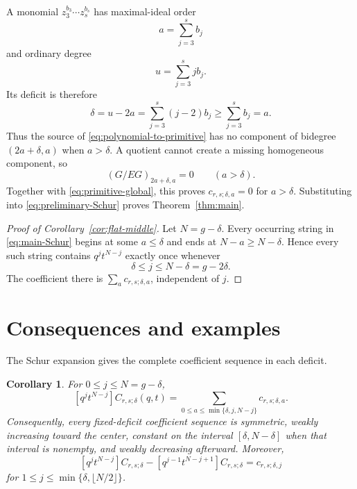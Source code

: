 \documentclass[11pt]{article}
\newtheorem{corollary}[theorem]{Corollary}
\begin{document}
A monomial $z_3^{b_3}\cdots z_s^{b_s}$ has maximal-ideal order
\[
 a=\sum_{j=3}^s b_j
\]
and ordinary degree
\[
 u=\sum_{j=3}^s j b_j.
\]
Its deficit is therefore
\begin{equation}\label{eq:monomial-deficit}
 \delta=u-2a
 =\sum_{j=3}^s(j-2)b_j
 \geq\sum_{j=3}^s b_j=a.
\end{equation}
Thus the source of \eqref{eq:polynomial-to-primitive} has no component
of bidegree $(2a+\delta,a)$ when $a>\delta$.  A quotient cannot create
a missing homogeneous component, so
\[
 (G/EG)_{2a+\delta,a}=0
 \qquad(a>\delta).
\]
Together with \eqref{eq:primitive-global}, this proves
$c_{r,s;\delta,a}=0$ for $a>\delta$.  Substituting into
\eqref{eq:preliminary-Schur} proves
Theorem~\ref{thm:main}.

\begin{proof}[Proof of Corollary~\ref{cor:flat-middle}]
Let $N=g-\delta$.  Every occurring string in
\eqref{eq:main-Schur} begins at some $a\leq\delta$ and ends at
$N-a\geq N-\delta$.  Hence every such string contains
$q^jt^{N-j}$ exactly once whenever
\[
 \delta\leq j\leq N-\delta=g-2\delta.
\]
The coefficient there is $\sum_a c_{r,s;\delta,a}$, independent of
$j$.
\end{proof}

\section{Consequences and examples}\label{sec:consequences}

The Schur expansion gives the complete coefficient sequence in each
deficit.

\begin{corollary}\label{cor:coefficient-formula}
For $0\leq j\leq N=g-\delta$,
\begin{equation}\label{eq:coefficient-formula}
 [q^jt^{N-j}]C_{r,s;\delta}(q,t)
 =\sum_{0\leq a\leq\min\{\delta,j,N-j\}}
 c_{r,s;\delta,a}.
\end{equation}
Consequently, every fixed-deficit coefficient sequence is symmetric,
weakly increasing toward the center, constant on the interval
$[\delta,N-\delta]$ when that interval is nonempty, and weakly
decreasing afterward.  Moreover,
\begin{equation}\label{eq:coefficient-difference}
 [q^jt^{N-j}]C_{r,s;\delta}
 -[q^{j-1}t^{N-j+1}]C_{r,s;\delta}
 =c_{r,s;\delta,j}
\end{equation}
for $1\leq j\leq\min\{\delta,\lfloor N/2\rfloor\}$.
\end{corollary}
\end{document}
